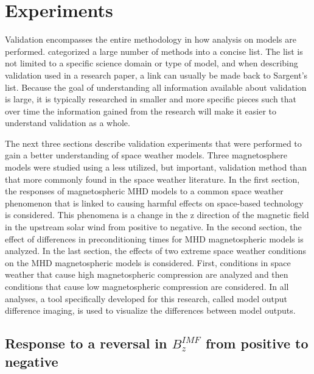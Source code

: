 \chapter[Experiments]{Experiments} Validation encompasses the
entire methodology in how analysis on models are performed. \citet{Sargent2004}
categorized a large number of methods into a concise list. The list is not
limited to a specific science domain or type of model, and when describing
validation used in a research paper, a link can usually be made back to
Sargent's list. Because the goal of understanding all information available
about validation is large, it is typically researched in smaller and more
specific pieces such that over time the information gained from the research
will make it easier to understand validation as a whole.

The next three sections describe validation experiments that were performed to
gain a better understanding of space weather models. Three magnetosphere models
were studied using a less utilized, but important, validation method than that
more commonly found in the space weather literature. In the first section, the
responses of magnetospheric MHD models to a common space weather phenomenon that
is linked to causing harmful effects on space-based technology is considered.
This phenomena is a change in the z direction of the magnetic field in the
upstream solar wind from positive to negative. In the second section, the
effect of differences in preconditioning times for MHD magnetospheric models is
analyzed. In the last section, the effects of two extreme space weather
conditions on the MHD magnetospheric models is considered. First, conditions in
space weather that cause high magnetospheric compression are analyzed and then
conditions that cause low magnetospheric compression are considered. In all
analyses, a tool specifically developed for this research, called model output
difference imaging, is used to visualize the differences between model outputs.

\section[IMF $B_z$ Reversal]{Response to a reversal in $B_z^{IMF}$
from positive to negative}

